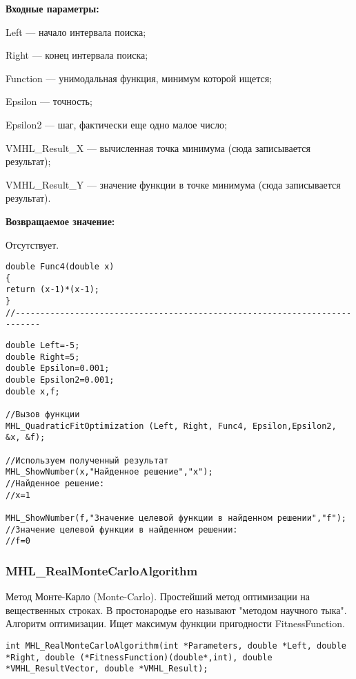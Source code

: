 \documentclass[a4paper,12pt]{article}
\begin{document}
\textbf{Входные параметры:}

 Left --- начало интервала поиска;
 
Right --- конец интервала поиска;
 
Function --- унимодальная функция, минимум которой ищется;
 
Epsilon --- точность;
 
Epsilon2 --- шаг, фактически еще одно малое число;
 
VMHL\_Result\_X --- вычисленная точка минимума (сюда записывается результат);
 
VMHL\_Result\_Y --- значение функции в точке минимума (сюда записывается результат).

\textbf{Возвращаемое значение:}
 
 Отсутствует.

\begin{lstlisting}[caption=Оптимизируемая функция]
double Func4(double x)
{
return (x-1)*(x-1);
}
//---------------------------------------------------------------------------
\end{lstlisting}


\begin{lstlisting}[label=code_use_MHL_QuadraticFitOptimization,caption=Пример использования]
double Left=-5;
double Right=5;
double Epsilon=0.001;
double Epsilon2=0.001;
double x,f;

//Вызов функции
MHL_QuadraticFitOptimization (Left, Right, Func4, Epsilon,Epsilon2, &x, &f);

//Используем полученный результат
MHL_ShowNumber(x,"Найденное решение","x");
//Найденное решение:
//x=1

MHL_ShowNumber(f,"Значение целевой функции в найденном решении","f");
//Значение целевой функции в найденном решении:
//f=0
\end{lstlisting}

\subsubsection{MHL\_RealMonteCarloAlgorithm}\label{MHL_RealMonteCarloAlgorithm}

Метод Монте-Карло (Monte-Carlo). Простейший метод оптимизации на вещественных строках. В простонародье его называют "методом научного тыка".
Алгоритм оптимизации. Ищет максимум функции пригодности FitnessFunction.


\begin{lstlisting}[label=code_syntax_MHL_RealMonteCarloAlgorithm,caption=Синтаксис]
int MHL_RealMonteCarloAlgorithm(int *Parameters, double *Left, double *Right, double (*FitnessFunction)(double*,int), double *VMHL_ResultVector, double *VMHL_Result);
\end{lstlisting}
\end{document}
